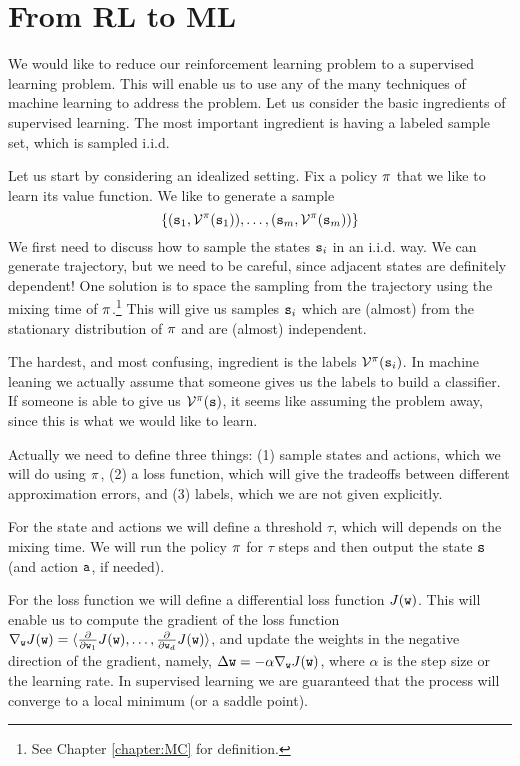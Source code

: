 \section{From RL to ML}

We would like to reduce our reinforcement learning problem to a
supervised learning problem. This will enable us to use any of the
many techniques of machine learning to address the problem. Let us
consider the basic ingredients of supervised learning. The most
important ingredient is having a labeled sample set, which is
sampled i.i.d.

Let us start by considering an idealized setting. Fix a policy
$\pi$ that we like to learn its value function. We like to
generate a sample
\[
\{({\tt s}_1, \mathcal{V}^\pi({\tt s}_1)),\ldots,
({\tt s}_m,\mathcal{V}^\pi({\tt s}_m))\}
\]
We first need to discuss how to sample the states ${\tt s}_i$ in an
i.i.d. way. We can generate trajectory, but we need to be careful,
since adjacent states are definitely dependent! One solution is to
space the sampling from the trajectory using the mixing time of
$\pi$.\footnote{See Chapter \ref{chapter:MC} for definition.}
This will give us samples ${\tt s}_i$ which are (almost) from the
stationary distribution of $\pi$ and are (almost) independent.

The hardest, and most confusing, ingredient is the labels
$\mathcal{V}^\pi({\tt s}_i)$. In machine leaning we actually assume
that someone gives us the labels to build a classifier.
If someone is able to give us
$\mathcal{V}^\pi({\tt s})$, it seems like assuming the problem away,
since this is what we would like to learn.

Actually we need to define three things: (1) sample states and actions,
which we will do using $\pi$, (2) a loss function, which will
give the tradeoffs between different approximation errors, and (3)
labels, which we are not given explicitly.

For the state and actions we will define a threshold $\tau$, which
will depends on the mixing time. We will run the policy $\pi$
for $\tau$ steps and then output the state ${\tt s}$ (and action
${\tt a}$, if needed).

For the loss function we will define a differential loss function
$J({\tt w})$. This will enable us to compute the gradient of the
loss function $\nabla_{\tt w}
J({\tt w})=\langle\frac{\partial}{\partial {\tt w}_1}J({\tt w}),
\ldots , \frac{\partial}{\partial {\tt w}_d}J({\tt w})\rangle$, and
update the weights in the negative direction of the gradient,
namely, $\Delta {\tt w}=-\alpha\nabla_{\tt w} J({\tt w})$, where
$\alpha$ is the step size or the learning rate. In supervised
learning we are guaranteed that the process will converge to a local
minimum (or a saddle point).

